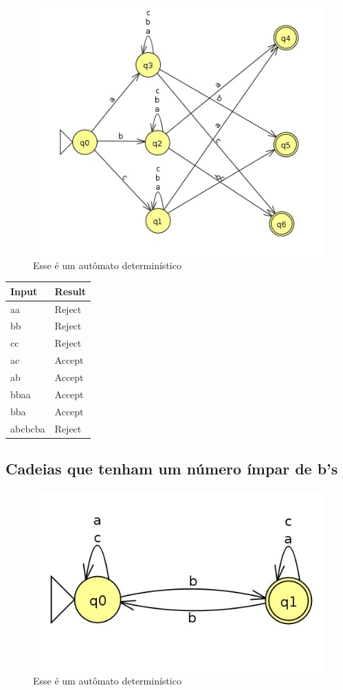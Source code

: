 \documentclass[11pt]{article}
\begin{document}
\begin{figure}[htbp]
\centering
\includegraphics[width=.9\linewidth]{./q1/f/q1f.jpg}
\caption{\label{fig:org541a9d9}
Esse é um autômato determinístico}
\end{figure}

\begin{center}
\begin{tabular}{ll}
Input & Result\\
\hline
aa & Reject\\
bb & Reject\\
cc & Reject\\
ac & Accept\\
ab & Accept\\
bbaa & Accept\\
bba & Accept\\
abcbcba & Reject\\
\end{tabular}
\end{center}

\subsection{Cadeias que tenham um número ímpar de b’s}
\label{sec:orgdbc3c24}
\begin{figure}[htbp]
\centering
\includegraphics[width=.9\linewidth]{./q1/g/q1g.jpg}
\caption{\label{fig:orgd3ced22}
Esse é um autômato determinístico}
\end{figure}
\end{document}
